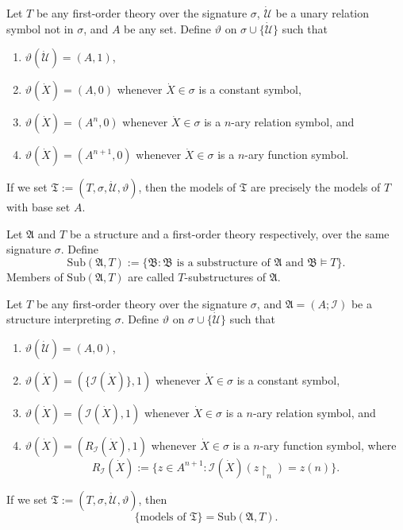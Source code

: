 \documentclass[12pt]{article}
\numberwithin{equation}{section}
\begin{document}
\begin{ex}
Let $T$ be any first-order theory over the signature $\sigma$, $\dot{\mathcal{U}}$ be a unary relation symbol not in $\sigma$, and $A$ be any set. Define $\vartheta$ on $\sigma \cup \{\dot{\mathcal{U}}\}$ such that
\begin{enumerate}[label=(\alph*)]
    \item $\vartheta(\dot{\mathcal{U}}) = (A, 1)$,
    \item $\vartheta(\dot{X}) = (A, 0)$ whenever $\dot{X} \in \sigma$ is a constant symbol,
    \item $\vartheta(\dot{X}) = (A^n, 0)$ whenever $\dot{X} \in \sigma$ is a $n$-ary relation symbol, and
    \item  $\vartheta(\dot{X}) = (A^{n+1}, 0)$ whenever $\dot{X} \in \sigma$ is a $n$-ary function symbol.
\end{enumerate}
If we set $\mathfrak{T} := (T, \sigma, \dot{\mathcal{U}}, \vartheta)$, then the models of $\mathfrak{T}$ are precisely the models of $T$ with base set $A$.
\end{ex}

\begin{defi}
Let $\mathfrak{A}$ and $T$ be a structure and a first-order theory respectively, over the same signature $\sigma$. Define $$\mathrm{Sub}(\mathfrak{A}, T) := \{\mathfrak{B} : \mathfrak{B} \text{ is a substructure of } \mathfrak{A} \text{ and } \mathfrak{B} \models T\}.$$ Members of $\mathrm{Sub}(\mathfrak{A}, T)$ are called $T$-substructures of $\mathfrak{A}$.
\end{defi}

\begin{ex}\label{2ndex}
Let $T$ be any first-order theory over the signature $\sigma$, and $\mathfrak{A} = (A; \mathcal{I})$ be a structure interpreting $\sigma$. Define $\vartheta$ on $\sigma \cup \{\dot{\mathcal{U}}\}$ such that
\begin{enumerate}[label=(\alph*)]
    \item $\vartheta(\dot{\mathcal{U}}) = (A, 0)$,
    \item $\vartheta(\dot{X}) = (\{\mathcal{I}(\dot{X})\}, 1)$ whenever $\dot{X} \in \sigma$ is a constant symbol,
    \item $\vartheta(\dot{X}) = (\mathcal{I}(\dot{X}), 1)$ whenever $\dot{X} \in \sigma$ is a $n$-ary relation symbol, and
    \item  $\vartheta(\dot{X}) = (R_{\mathcal{I}}(\dot{X}), 1)$ whenever $\dot{X} \in \sigma$ is a $n$-ary function symbol, where $$R_{\mathcal{I}}(\dot{X}) := \{z \in A^{n+1} : \mathcal{I}(\dot{X})(z \! \restriction_n) = z(n)\}.$$
\end{enumerate}
If we set $\mathfrak{T} := (T, \sigma, \dot{\mathcal{U}}, \vartheta)$, then $$\{ \text{models of } \mathfrak{T}\} = \mathrm{Sub}(\mathfrak{A}, T).$$
\end{ex}
\end{document}
